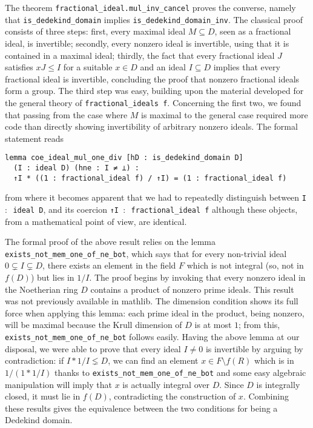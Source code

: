 \documentclass[a4paper,USenglish,cleveref, autoref, thm-restate]{lipics-v2021}
\newcommand{\lean}[1]{\texttt{#1}\xspace} %
\newcommand{\mathlib}{\textsf{mathlib}\xspace}
\begin{document}
The theorem \lean{fractional\_ideal.mul\_inv\_cancel} proves the converse, namely that \lean{is\_dedekind\_domain} implies \lean{is\_dedekind\_domain\_inv}. The classical proof consists of three steps: first, every maximal ideal $M\subseteq D$, seen as a fractional ideal, is invertible;
secondly, every nonzero ideal is invertible, using that it is contained in a maximal ideal;
thirdly, the fact that every fractional ideal $J$ satisfies $xJ\leq I$ for a suitable $x\in D$ and an ideal $I\subseteq D$ implies that every fractional ideal is invertible, concluding the proof that nonzero fractional ideals form a group.
The third step was easy, building upon the material developed for the general theory of \lean{fractional\_ideals f}. Concerning the first two, we found that passing from the case where $M$ is maximal to the general case required more code than directly showing invertibility of arbitrary nonzero ideals. The formal statement reads
\begin{lstlisting}
lemma coe_ideal_mul_one_div [hD : is_dedekind_domain D] 
  (I : ideal D) (hne : I ≠ ⊥) :
  ↑I * ((1 : fractional_ideal f) / ↑I) = (1 : fractional_ideal f)
\end{lstlisting}
from where it becomes apparent that we had to repeatedly distinguish between \lean{I $:$ ideal D}, and its coercion \lean{↑I $:$ fractional\_ideal f} although these objects, from a mathematical point of view, are identical.

The formal proof of the above result relies on the lemma \lean{exists\_not\_mem\_one\_of\_ne\_bot}, which says that for every non-trivial ideal $0\subsetneq I\subsetneq D$, there exists an element in the field $F$ which is not integral (so, not in $f(D)$) but lies in $1/I$. The proof begins by invoking that every nonzero ideal in the Noetherian ring $D$ contains a product of nonzero prime ideals. This result was not previously available in \mathlib. %
The dimension condition shows its full force when applying this lemma:
each prime ideal in the product, being nonzero, will be maximal because the Krull dimension of $D$ is at most $1$; from this, \lean{exists\_not\_mem\_one\_of\_ne\_bot} follows easily. Having the above lemma at our disposal,
we were able to prove that every ideal $I\ne 0$ is invertible by arguing by contradiction: if $I\ast 1/I\lneq D$, we can find an element $x\in F\setminus f(R)$ which is in $1/(1\ast 1/I)$ thanks to \lean{exists\_not\_mem\_one\_of\_ne\_bot} and some easy algebraic manipulation will imply that $x$ is actually integral over $D$. Since $D$ is integrally closed, it must lie in $f(D)$, contradicting the construction of $x$. Combining these results gives the equivalence between the two conditions for being a Dedekind domain.
\end{document}
